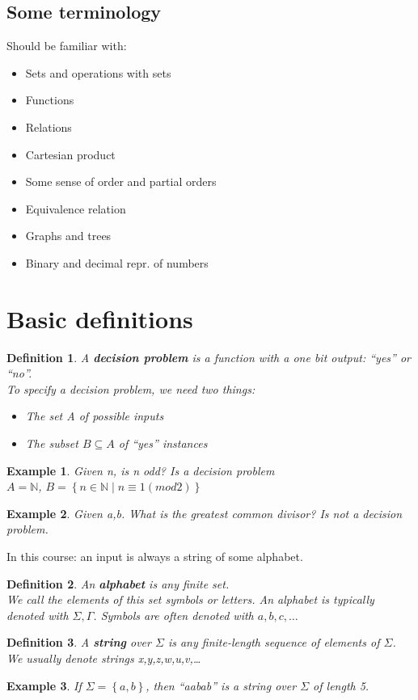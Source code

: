 \documentclass[a4paper]{article}
\newtheorem{definition}{Definition}
\newtheorem{example}{Example}
\begin{document}
\subsection{Some terminology}
Should be familiar with:
\begin{itemize}
    \item Sets and operations with sets
    \item Functions
    \item Relations
    \item Cartesian product
    \item Some sense of order and partial orders
    \item Equivalence relation
    \item Graphs and trees
    \item Binary and decimal repr. of numbers
\end{itemize}
\section{Basic definitions}
\begin{definition}
    A \textbf{decision problem} is a function with a one bit output: ``yes'' or ``no''.\\
    To specify a decision problem, we need two things:
    \begin{itemize}
        \item The set A of possible inputs
        \item The subset $B\subseteq A$ of ``yes'' instances
    \end{itemize}
\end{definition}
\begin{example}
    Given n, is n odd? Is a decision problem\\
    $A=\mathbb{N}$, $B=\left\{ n\in\mathbb{N} \middle| n\equiv 1 (mod 2) \right\}$\\
\end{example}
\begin{example}
    Given a,b. What is the greatest common divisor? Is not a decision problem.
\end{example}
In this course: an input is always a string of some alphabet.
\begin{definition}
    An \textbf{alphabet} is any finite set.\\
    We call the elements of this set symbols or letters. An alphabet is typically
    denoted with $\Sigma, \Gamma$. Symbols are often denoted with $a,b,c,\ldots$
\end{definition}
\begin{definition}
    A \textbf{string} over $\Sigma$ is any finite-length sequence of elements of $\Sigma$.\\
    We usually denote strings x,y,z,w,u,v,\ldots
\end{definition}
\begin{example}
    If $\Sigma=\left\{ a,b \right\}$, then ``aabab'' is a string over $\Sigma$ of length 5.
\end{example}
\end{document}
